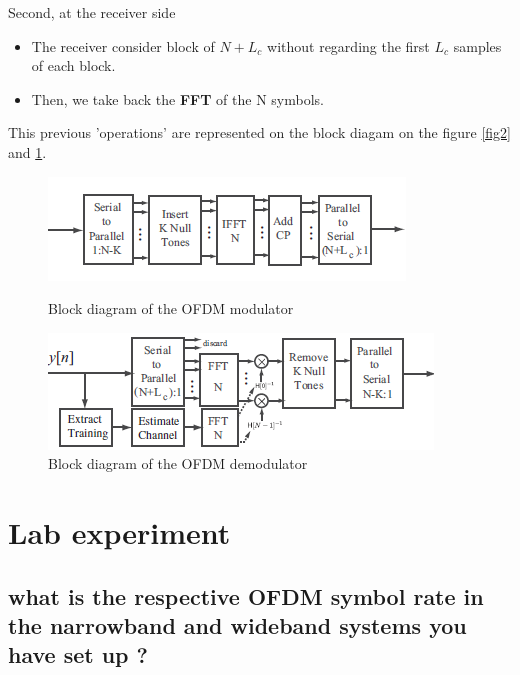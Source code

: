 \documentclass[frenchb, oneside, headings=normal]{scrartcl}
\begin{document}
Second, at the receiver side

\begin{itemize}

\item The receiver consider block of $N+L_c$ without regarding the first $L_c$ samples of each block.

\item Then, we take back the \textbf{FFT} of the N symbols.

\end{itemize}

This previous 'operations' are represented on the block diagam on the figure \ref{fig2} and \ref{fig3}.

\begin{figure}[!ht]
    \begin{minipage}[b]{0.48\linewidth}
        \centering \includegraphics[scale=0.9]{img/OFDDM_modulator.png}
     \caption{Block diagram of the OFDM modulator}
     \label{fig2}
    \end{minipage}\hfill
    \begin{minipage}[b]{0.48\linewidth}
         \centering \includegraphics[scale=0.9]{img/OFDDM_demodulator.png}
 \caption{Block diagram of the OFDM demodulator}\label{fig3}
    \end{minipage}
\end{figure}


\section{Lab experiment}

\subsection{what is the respective OFDM symbol rate in the narrowband and wideband systems you have set up ?}
\end{document}
